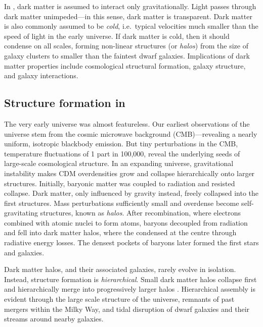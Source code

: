 In \LCDM{}, dark matter is assumed to interact only gravitationally.
Light passes through dark matter unimpeded---in this sense, dark matter
is transparent. Dark matter is also commonly assumed to be \emph{cold},
i.e.~typical velocities much smaller than the speed of light in the
early universe. If dark matter is cold, then it should condense on all
scales, forming non-linear structures (or \emph{halos}) from the size of
galaxy clusters to smaller than the faintest dwarf galaxies.
Implications of dark matter properties include cosmological structural
formation, galaxy structure, and galaxy interactions.

\subsection{\texorpdfstring{Structure formation in
\LCDM{}}{Structure formation in }}\label{structure-formation-in}

The very early universe was almost featureless. Our earliest
observations of the universe stem from the cosmic microwave background
(CMB)---revealing a nearly uniform, isotropic blackbody emission. But
tiny perturbations in the CMB, temperature fluctuations of 1 part in
100,000, reveal the underlying seeds of large-scale cosmological
structure. In an expanding universe, gravitational instability makes CDM
overdensities grow and collapse hierarchically onto larger structures.
Initially, baryonic matter was coupled to radiation and resisted
collapse. Dark matter, only influenced by gravity instead, freely
collapsed into the first structures. Mass perturbations sufficiently
small and overdense become self-gravitating structures, known as
\emph{halos}. After recombination, where electrons combined with atomic
nuclei to form atoms, baryons decoupled from radiation and fell into
dark matter halos, where the condensed at the centre through radiative
energy losses. The densest pockets of baryons later formed the first
stars and galaxies.

Dark matter halos, and their associated galaxies, rarely evolve in
isolation. Instead, \LCDM{} structure formation is \emph{hierarchical}.
Small dark matter halos collapse first and hierarchically merge into
progressively larger halos
\citep[e.g.,][]{white+rees1978, blumenthal+1984, white+frenk1991}.
Hierarchical assembly is evident through the large scale structure of
the universe, remnants of past mergers within the Milky Way, and tidal
disruption of dwarf galaxies and their streams around nearby galaxies.

